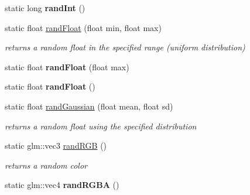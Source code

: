 \begin{DoxyCompactItemize}
\mbox{\label{classnta_1_1Random_aa380bcf4be06bc5b5e4707b7ae5a7907}} 
static long {\bfseries rand\+Int} ()
\item 
\mbox{\label{classnta_1_1Random_a102ed2efec77f974731e5dcdb428174a}} 
static float \hyperlink{classnta_1_1Random_a102ed2efec77f974731e5dcdb428174a}{rand\+Float} (float min, float max)
\begin{DoxyCompactList}\small\item\em returns a random float in the specified range (uniform distribution) \end{DoxyCompactList}\item 
\mbox{\label{classnta_1_1Random_a6820a1c36b820baa68f7bdb2f5f5bf88}} 
static float {\bfseries rand\+Float} (float max)
\item 
\mbox{\label{classnta_1_1Random_aae9df8240d99108188bd6cb223b384a2}} 
static float {\bfseries rand\+Float} ()
\item 
\mbox{\label{classnta_1_1Random_a6e12bc86e5851f01d70debf422746e0e}} 
static float \hyperlink{classnta_1_1Random_a6e12bc86e5851f01d70debf422746e0e}{rand\+Gaussian} (float mean, float sd)
\begin{DoxyCompactList}\small\item\em returns a random float using the specified distribution \end{DoxyCompactList}\item 
\mbox{\label{classnta_1_1Random_a45b43eef244823ccb5d016f79bad4ced}} 
static glm\+::vec3 \hyperlink{classnta_1_1Random_a45b43eef244823ccb5d016f79bad4ced}{rand\+R\+GB} ()
\begin{DoxyCompactList}\small\item\em returns a random color \end{DoxyCompactList}\item 
\mbox{\label{classnta_1_1Random_a6592035f3647ba9192469ea7a149c2e2}} 
static glm\+::vec4 {\bfseries rand\+R\+G\+BA} ()
\item 
\mbox{\label{classnta_1_1Random_ac4fdaa10f7d4646d4489933b48aca148}} 

\end{DoxyCompactItemize}
